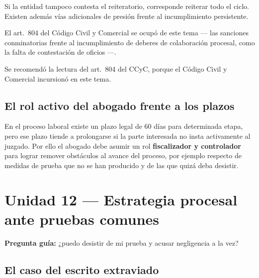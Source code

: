 \documentclass[12pt,oneside]{book}
\begin{document}
Si la entidad tampoco contesta el reiteratorio, corresponde reiterar todo el ciclo. Existen además vías adicionales de presión frente al incumplimiento persistente.

El art.\ 804 del Código Civil y Comercial se ocupó de este tema --- las sanciones conminatorias frente al incumplimiento de deberes de colaboración procesal, como la falta de contestación de oficios ---.

\begin{note}
Se recomendó la lectura del art.\ 804 del CCyC, porque el Código Civil y Comercial incursionó en este tema.
\end{note}

\subsection{El rol activo del abogado frente a los plazos}

En el proceso laboral existe un plazo legal de 60 días para determinada etapa, pero ese plazo tiende a prolongarse si la parte interesada no insta activamente al juzgado. Por ello el abogado debe asumir un rol \textbf{fiscalizador y controlador} para lograr remover obstáculos al avance del proceso, por ejemplo respecto de medidas de prueba que no se han producido y de las que quizá deba desistir.

\section{Unidad 12 --- Estrategia procesal ante pruebas comunes}

\textbf{Pregunta guía:} ¿puedo desistir de mi prueba y acusar negligencia a la vez?

\subsection{El caso del escrito extraviado}
\end{document}
